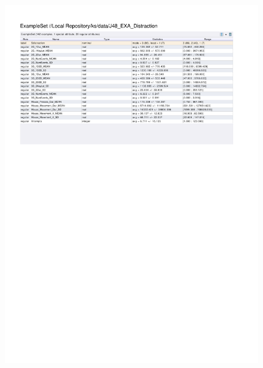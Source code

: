 \begin{figure}[htp]
  \centerline{\includegraphics[trim=0 561 0 60,clip,width=16.09cm]{results/J48_EXA_Distraction.pdf}} \caption{
} \label{J48_EXA_Distraction}
\end{figure}


